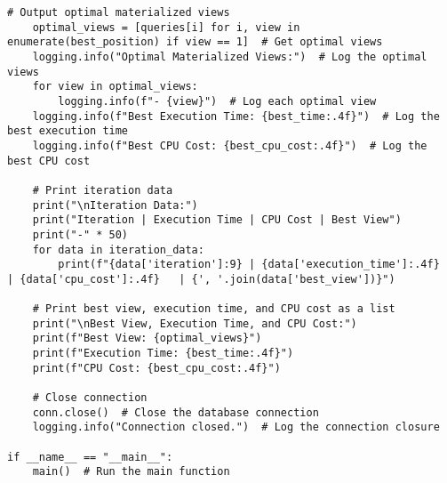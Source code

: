 \begin{lstlisting}[style=pythonstyle, caption={Python script to automate optimal view.}, label={lst:fullCode}]
    # Output optimal materialized views
    optimal_views = [queries[i] for i, view in enumerate(best_position) if view == 1]  # Get optimal views
    logging.info("Optimal Materialized Views:")  # Log the optimal views
    for view in optimal_views:
        logging.info(f"- {view}")  # Log each optimal view
    logging.info(f"Best Execution Time: {best_time:.4f}")  # Log the best execution time
    logging.info(f"Best CPU Cost: {best_cpu_cost:.4f}")  # Log the best CPU cost

    # Print iteration data
    print("\nIteration Data:")
    print("Iteration | Execution Time | CPU Cost | Best View")
    print("-" * 50)
    for data in iteration_data:
        print(f"{data['iteration']:9} | {data['execution_time']:.4f}       | {data['cpu_cost']:.4f}   | {', '.join(data['best_view'])}")

    # Print best view, execution time, and CPU cost as a list
    print("\nBest View, Execution Time, and CPU Cost:")
    print(f"Best View: {optimal_views}")
    print(f"Execution Time: {best_time:.4f}")
    print(f"CPU Cost: {best_cpu_cost:.4f}")

    # Close connection
    conn.close()  # Close the database connection
    logging.info("Connection closed.")  # Log the connection closure

if __name__ == "__main__":
    main()  # Run the main function

\end{lstlisting}